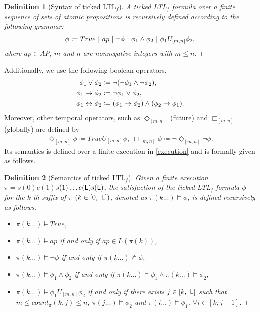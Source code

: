 \documentclass[journal,twoside,web]{IEEEtran}
\newcommand{\qedwhite}{\hfill \ensuremath{\Box}}
\newtheorem{dfn}{Definition}
\newcommand{\req}[1]{\eqref{#1}}
\newcommand{\Len}{{\sf L}}
\begin{document}
\begin{dfn}[Syntax of ticked LTL$_f$]\label{dfn:syntax}
A ticked LTL$_f$ formula over a finite sequence of sets of atomic propositions is recursively defined according to the following grammar: 
\begin{align}
\phi \coloneqq True \ |\ ap\ |\ \lnot \phi\ |\ \phi_1\land \phi_2\ |\ \phi_1U_{[m,n]} \phi_2 ,\notag
\end{align}
where $ap \in AP$, $m$ and $n$ are nonnegative integers with $m\leq n$. \qedwhite
\end{dfn}
%
Additionally, we use the following boolean operators.
\begin{align}
\phi_1 \lor \phi_2 &\coloneqq \lnot(\lnot \phi_1 \land \lnot \phi_2), \notag\\ 
\phi_1 \rightarrow \phi_2 & \coloneqq \lnot \phi_1 \lor \phi_2, \notag\\ 
\phi_1 \leftrightarrow \phi_2 &\coloneqq (\phi_1 \rightarrow \phi_2)\land(\phi_2 \rightarrow \phi_1). \notag
\end{align} 
Moreover, other temporal operators, such as $\Diamond_{[m,n]}$ (future) and $\Box_{[m,n]}$ (globally) are defined by
\begin{align}\label{futureglobal}
\Diamond_{[m,n]} \phi \coloneqq True U_{[m,n]} \phi, \ \Box_{[m,n]} \phi \coloneqq \lnot \Diamond_{[m,n]} \lnot \phi. 
\end{align}
%
Its semantics is defined over a finite execution in \req{execution} and is formally given as follows. 
\begin{dfn}[Semantics of ticked LTL$_f$]
Given a finite execution $\pi = s(0) e(1)$$s(1) \ldots e(\Len) s(\Len)$, the satisfaction of the ticked LTL$_f$ formula $\phi$ for the $k$-th suffix of $\pi$ $(k\in [0,\ \Len])$, denoted as $\pi (k...) \models \phi$, is defined recursively as follows.
\begin{itemize}
\item 	$\pi(k...) \models True$,
\item 	$\pi(k...) \models ap$ if and only if $ap \in L(\pi(k))$,
\item 	$\pi(k...) \models \lnot \phi$ if and only if $\pi(k...) \not\models \phi$,
\item 	$\pi(k...) \models \phi_1\land \phi_2$ if and only if $\pi(k...) \models \phi_1 \land \pi(k...)\models \phi_2$,
\item 	$\pi(k...) \models \phi_1U_{[m,n]} \phi_2$ if and only if there exists $j \in [k ,\ \Len]$ such that $m \leq count_\pi(k, j) \leq n$, $\pi(j...) \models \phi_2$ and $\pi(i...) \models \phi_1$, $\forall i \in [k,j-1]$. \qedwhite
	\end{itemize}
	\end{dfn}
\end{document}
